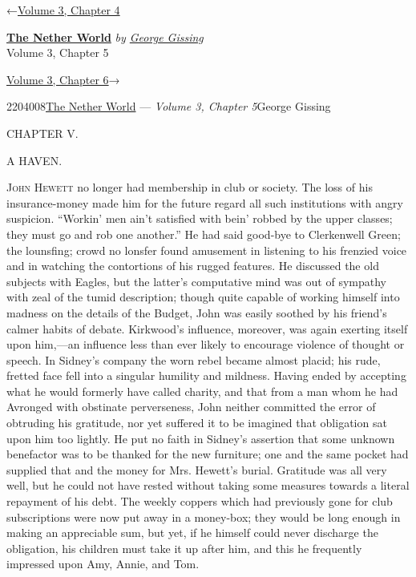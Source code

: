 \hypertarget{headerContainer}{}
\hypertarget{navigationHeader}{}
\protect\hypertarget{headerprevious}{}{←\href{/wiki/The_Nether_World/Volume_3/Chapter_4}{Volume
3, Chapter 4}}

\textbf{\protect\hypertarget{header_title_text}{}{\href{/wiki/The_Nether_World}{The
Nether World}}} \emph{by
\href{/wiki/Author:George_Gissing}{\protect\hypertarget{header_author_text}{}{{George
Gissing}}}}\\
\protect\hypertarget{header_section_text}{}{Volume 3, Chapter 5}

\protect\hypertarget{headernext}{}{\href{/wiki/The_Nether_World/Volume_3/Chapter_6}{Volume
3, Chapter 6}→}

\hypertarget{navigationNotes}{}

\hypertarget{ws-data}{}
\protect\hypertarget{ws-article-id}{}{2204008}\protect\hypertarget{ws-title}{}{\href{/wiki/The_Nether_World}{The
Nether World} --- \emph{Volume 3, Chapter
5}}\protect\hypertarget{ws-author}{}{George Gissing}

{\protect\hypertarget{93}{}{}}

{CHAPTER V.}

A HAVEN.

\textsc{John Hewett} no longer had membership in club or society. The
loss of his insurance-money made him for the future regard all such
institutions with angry suspicion. ``Workin' men ain't satisfied with
bein' robbed by the upper classes; they must go and rob one another.''
He had said good-bye to Clerkenwell Green; the lounsfing; crowd no
lonsfer found amusement in listening to his frenzied voice and in
watching the contortions of his rugged features. He discussed the old
subjects with Eagles, but the latter's computative mind was out of
sympathy with zeal of the tumid description; though quite capable of
working himself into madness on the details of the Budget, John was
easily soothed by his friend's calmer habits of debate. Kirkwood's
influence, moreover, was again exerting itself
{\protect\hypertarget{94}{}{}} upon him,---an influence less than ever
likely to encourage violence of thought or speech. In Sidney's company
the worn rebel became almost placid; his rude, fretted face fell into a
singular humility and mildness. Having ended by accepting what he would
formerly have called charity, and that from a man whom he had Avronged
with obstinate perverseness, John neither committed the error of
obtruding his gratitude, nor yet suffered it to be imagined that
obligation sat upon him too lightly. He put no faith in Sidney's
assertion that some unknown benefactor was to be thanked for the new
furniture; one and the same pocket had supplied that and the money for
Mrs. Hewett's burial. Gratitude was all very well, but he could not have
rested without taking some measures towards a literal repayment of his
debt. The weekly coppers which had previously gone for club
subscriptions were now put away in a money-box; they would be long
enough in making an appreciable sum, but yet, if he himself could never
discharge the obligation, his children must take it up after him, and
this he frequently impressed upon Amy, Annie, and Tom.

